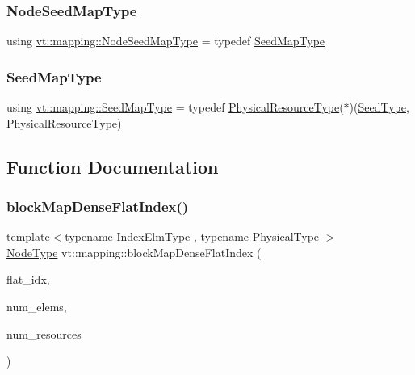 \subsubsection{\texorpdfstring{Node\+Seed\+Map\+Type}{NodeSeedMapType}}
{\footnotesize\ttfamily using \hyperlink{namespacevt_1_1mapping_a84d654b657f2dbe639ada06ae688e4c7}{vt\+::mapping\+::\+Node\+Seed\+Map\+Type} = typedef \hyperlink{namespacevt_1_1mapping_a1c1409d9af8d1ac402af022a65be4a4d}{Seed\+Map\+Type}}

\mbox{\label{namespacevt_1_1mapping_a1c1409d9af8d1ac402af022a65be4a4d}} 
\subsubsection{\texorpdfstring{Seed\+Map\+Type}{SeedMapType}}
{\footnotesize\ttfamily using \hyperlink{namespacevt_1_1mapping_a1c1409d9af8d1ac402af022a65be4a4d}{vt\+::mapping\+::\+Seed\+Map\+Type} = typedef \hyperlink{namespacevt_a2dc36fcada816dc6d11774d650328ee9}{Physical\+Resource\+Type}($\ast$)(\hyperlink{namespacevt_ae2e13198bdef4d5b8e603d6c1c7f0969}{Seed\+Type}, \hyperlink{namespacevt_a2dc36fcada816dc6d11774d650328ee9}{Physical\+Resource\+Type})}



\subsection{Function Documentation}
\mbox{\label{namespacevt_1_1mapping_abaff3ea69ef07a3762befc3628b8b577}} 
\subsubsection{\texorpdfstring{block\+Map\+Dense\+Flat\+Index()}{blockMapDenseFlatIndex()}}
{\footnotesize\ttfamily template$<$typename Index\+Elm\+Type , typename Physical\+Type $>$ \\
\hyperlink{namespacevt_a866da9d0efc19c0a1ce79e9e492f47e2}{Node\+Type} vt\+::mapping\+::block\+Map\+Dense\+Flat\+Index (\begin{DoxyParamCaption}\item[{Index\+Elm\+Type $\ast$}]{flat\+\_\+idx,  }\item[{Index\+Elm\+Type $\ast$}]{num\+\_\+elems,  }\item[{Physical\+Type}]{num\+\_\+resources }\end{DoxyParamCaption})\hspace{0.3cm}{\ttfamily [inline]}}

